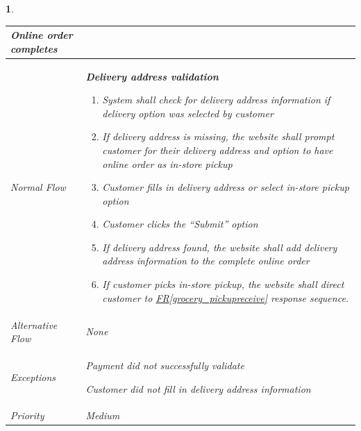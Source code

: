 \documentclass{scrreprt}
\theoremstyle{funreq}
\newtheorem{funreq}{}
\newcommand*{\reqref}[1]{\hyperref[#1]{FR\ref*{#1}}}
\begin{document}
\begin{funreq}
\begin{table}[H]
{\begin{tabularx}{\columnwidth}{|l|X|}
					
                    Online order completes
					\\ \hline Normal Flow &
					\bfseries{Delivery address validation}\normalfont\newline 
					\begin{enumerate}
					    \item System shall check for delivery address information if delivery option was selected by customer
					    \item If delivery address is missing, the website shall prompt customer for their delivery address and option to have online order as in-store pickup
                        \item Customer fills in delivery address or select in-store pickup option
                        \item Customer clicks the “Submit” option
                        \item If delivery address found, the website shall add delivery address information to the complete online order
                        \item If customer picks in-store pickup, the website shall direct customer to \reqref{grocery_pickupreceive} response sequence.
					\end{enumerate}
					\\ \hline Alternative Flow & 
					None
					\\ \hline Exceptions & Payment did not successfully validate
                        
                        Customer did not fill in delivery address information
					\\ \hline Priority & 
					Medium
					\\ \hline
				\end{tabularx}%
			}
		\end{table}
	\end{funreq}
	
\end{document}
